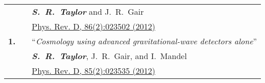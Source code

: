 \documentclass[11pt,letterpaper,sans]{moderncv}
\begin{document}
{\begin{longtable}{rp{0.3cm}p{15.8cm}}
&& \textit{\textbf{S.~R.~Taylor}} and J.~R.~Gair \\ 
&& \href{http://journals.aps.org/prd/abstract/10.1103/PhysRevD.86.023502}{{\color{color1} Phys. Rev. D, 86(2):023502 (2012)}} \vspace{0.09cm}\\
\textbf{1.} & & ``\textit{Cosmology using advanced gravitational-wave detectors alone}'' \\ 
&& \textit{\textbf{S.~R.~Taylor}}, J.~R.~Gair, and I.~Mandel \\ 
&& \href{http://journals.aps.org/prd/abstract/10.1103/PhysRevD.85.023535}{{\color{color1} Phys. Rev. D, 85(2):023535 (2012)}} \vspace{0.09cm}\\
\end{longtable}
}
\end{document}
